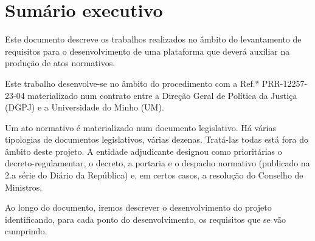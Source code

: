 \chapter{Sumário executivo}

Este documento descreve os trabalhos realizados no âmbito do levantamento de requisitos para o desenvolvimento 
de uma plataforma que deverá auxiliar na produção de atos normativos.

Este trabalho desenvolve-se no âmbito do procedimento com a Ref.ª PRR-12257-23-04 materializado num contrato 
entre a Direção Geral de Política da Justiça (DGPJ) e a Universidade do Minho (UM).

Um ato normativo é materializado num documento legislativo.
Há várias tipologias de documentos legislativos, várias dezenas.
Tratá-las todas está fora do âmbito deste projeto.
A entidade adjudicante designou como prioritárias o decreto-regulamentar, o decreto, a portaria e o despacho normativo 
(publicado na 2.a série do Diário da República) e, em certos casos, a resolução do Conselho de Ministros.

Ao longo do documento, iremos descrever o desenvolvimento do projeto identificando, para cada ponto do desenvolvimento,
os requisitos que se vão cumprindo.